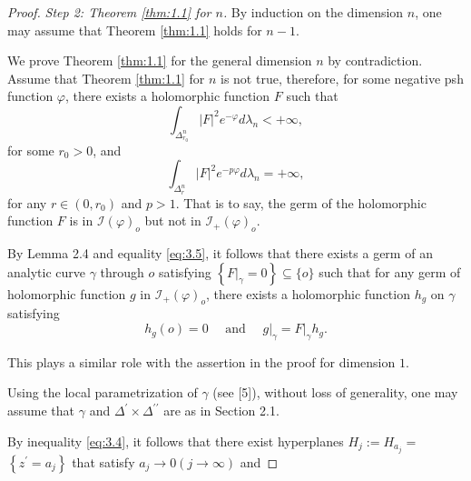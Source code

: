 \documentclass[lang=en,12pt,twoside]{textbook}
\begin{document}
\begin{proof}
\textit{Step 2: Theorem \ref{thm:1.1} for $n$.} By induction on the dimension $n$, one may assume that Theorem \ref{thm:1.1} holds for $n-1$.

We prove Theorem \ref{thm:1.1} for the general dimension $n$ by contradiction. Assume that Theorem \ref{thm:1.1} for $n$ is not true, therefore, for some negative psh function $\varphi$, there exists a holomorphic function $F$ such that
\begin{equation}\label{eq:3.4}
    \int_{\Delta_{r_0}^n}|F|^2 e^{-\varphi} d \lambda_n<+\infty,
\end{equation}
for some $r_0>0$, and
\begin{equation}\label{eq:3.5}
    \int_{\Delta_r^n}|F|^2 e^{-p \varphi} d \lambda_n=+\infty,
\end{equation}
for any $r \in\left(0, r_0\right)$ and $p>1$. That is to say, the germ of the holomorphic function $F$ is in $\mathcal{I}(\varphi)_o$ but not in $\mathcal{I}_{+}(\varphi)_o$.

By Lemma 2.4 and equality \ref{eq:3.5}, it follows that there exists a germ of an analytic curve $\gamma$ through $o$ satisfying $\left\{\left.F\right|_\gamma=0\right\} \subseteq\{o\}$ such that for any germ of holomorphic function $g$ in $\mathcal{I}_{+}(\varphi)_o$, there exists a holomorphic function $h_g$ on $\gamma$ satisfying
\begin{equation}\label{eq:3.6}
    h_g(o)=0 \quad \text { and }\left.\quad g\right|_\gamma=\left.F\right|_\gamma h_g .
\end{equation}

This plays a similar role with the assertion in the proof for dimension $1$.

Using the local parametrization of $\gamma$ (see [5]), without loss of generality, one may assume that $\gamma$ and $\Delta^{\prime} \times \Delta^{\prime \prime}$ are as in Section 2.1.

By inequality \eqref{eq:3.4}, it follows that there exist hyperplanes $H_j:=H_{a_j}=$ $\left\{z^{\prime}=a_j\right\}$ that satisfy $a_j \rightarrow 0(j \rightarrow \infty)$ and


\end{proof}
\end{document}
